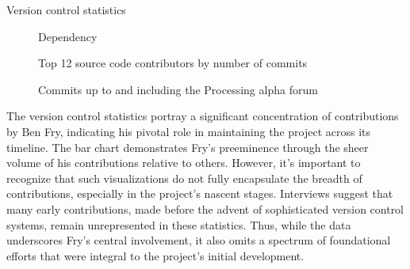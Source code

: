 \changepapersize{305.3mm:210mm}

{
	\LARGE
	\noindent Version control statistics
}

\vfill

\noindent
	\begin{minipage}[t]{0.15\textwidth}
		\noindent
		\begin{figure}[H]
			\caption{Dependency}
			\label{fig:dependency_comic}
		\end{figure}
	\end{minipage}
	\hspace{2mm}
	\begin{minipage}[t]{0.442\textwidth}
		\begin{figure}[H]
			\frame{}
			\caption{Top 12 source code contributors by number of commits}
			\label{fig:top12-github}
		\end{figure}
	\end{minipage}
\vspace{0.1cm}
\begin{figure}[H]
	\frame{}
	\caption{Commits up to and including the Processing alpha forum}
	\label{fig:alpha-commits}
\end{figure}

\begin{multicols}{3}
	\noindent	
	The version control statistics portray a significant concentration of contributions by Ben Fry, indicating his pivotal role in maintaining the project across its timeline. The bar chart demonstrates Fry's preeminence through the sheer volume of his contributions relative to others. However, it's important to recognize that such visualizations do not fully encapsulate the breadth of contributions, especially in the project's nascent stages. Interviews suggest that many early contributions, made before the advent of sophisticated version control systems, remain unrepresented in these statistics. Thus, while the data underscores Fry's central involvement, it also omits a spectrum of foundational efforts that were integral to the project's initial development.
	\vfill\null
\end{multicols}

